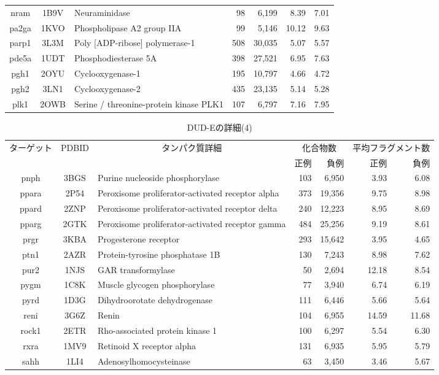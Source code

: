 \begin{table}[t]
\begin{tabular}{c|c|p{6cm}|rr|rr}
nram&1B9V&Neuraminidase&98&6,199&8.39&7.01 \\
pa2ga&1KVO&Phospholipase A2 group IIA&99&5,146&10.12&9.63 \\
parp1&3L3M&Poly [ADP-ribose] polymerase-1&508&30,035&5.07&5.57 \\
pde5a&1UDT&Phosphodiesterase 5A&398&27,521&6.95&7.63 \\
pgh1&2OYU&Cyclooxygenase-1&195&10,797&4.66&4.72 \\
pgh2&3LN1&Cyclooxygenase-2&435&23,135&5.14&5.28 \\
plk1&2OWB&Serine / threonine-protein kinase PLK1&107&6,797&7.16&7.95 \\
\hline
	\end{tabular}
\end{table}
\begin{table}[t] \centering
	\caption{DUD-Eの詳細(4)}
	\label{tb:dude_description:4}
	\begin{tabular}{c|c|p{6cm}|rr|rr}
	\hline
	\multirow{2}{*}{ターゲット}	&\multirow{2}{*}{PDBID}	&\multicolumn{1}{c|}{\multirow{2}{*}{タンパク質詳細}}	&\multicolumn{2}{c|}{化合物数}	&\multicolumn{2}{c}{平均フラグメント数}		\\
							&					&											&正例	&負例				&正例	&負例						\\ \hline
pnph&3BGS&Purine nucleoside phosphorylase&103&6,950&3.93&6.08 \\
ppara&2P54&Peroxisome proliferator-activated receptor alpha&373&19,356&9.75&8.98 \\
ppard&2ZNP&Peroxisome proliferator-activated receptor delta&240&12,223&8.95&8.69 \\
pparg&2GTK&Peroxisome proliferator-activated receptor gamma&484&25,256&9.19&8.61 \\
prgr&3KBA&Progesterone receptor&293&15,642&3.95&4.65 \\
ptn1&2AZR&Protein-tyrosine phosphatase 1B&130&7,243&8.98&7.62 \\
pur2&1NJS&GAR transformylase&50&2,694&12.18&8.54 \\
pygm&1C8K&Muscle glycogen phosphorylase&77&3,940&6.74&6.19 \\
pyrd&1D3G&Dihydroorotate dehydrogenase&111&6,446&5.66&5.64 \\
reni&3G6Z&Renin&104&6,955&14.59&11.68 \\
rock1&2ETR&Rho-associated protein kinase 1&100&6,297&5.54&6.30 \\
rxra&1MV9&Retinoid X receptor alpha&131&6,935&5.95&5.79 \\
sahh&1LI4&Adenosylhomocysteinase&63&3,450&3.46&5.67 \\

\end{tabular}
\end{table}
